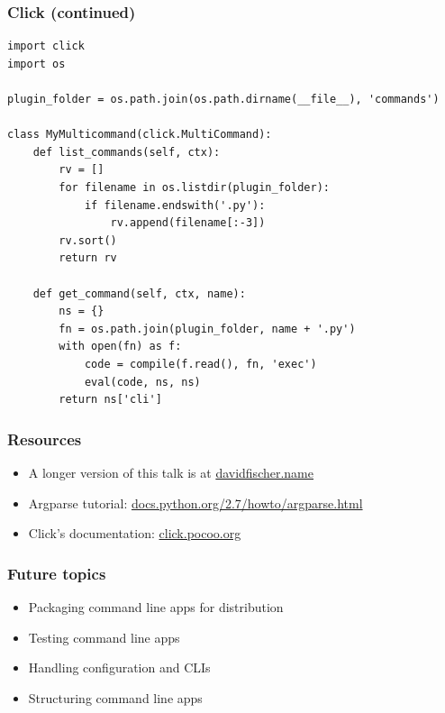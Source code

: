 \documentclass[handout]{beamer}
\begin{document}
\begin{frame}[fragile]
\frametitle{Click (continued)}

{\scriptsize
\begin{verbatim}
import click
import os

plugin_folder = os.path.join(os.path.dirname(__file__), 'commands')

class MyMulticommand(click.MultiCommand):
    def list_commands(self, ctx):
        rv = []
        for filename in os.listdir(plugin_folder):
            if filename.endswith('.py'):
                rv.append(filename[:-3])
        rv.sort()
        return rv

    def get_command(self, ctx, name):
        ns = {}
        fn = os.path.join(plugin_folder, name + '.py')
        with open(fn) as f:
            code = compile(f.read(), fn, 'exec')
            eval(code, ns, ns)
        return ns['cli']
\end{verbatim}
}

\end{frame}



\begin{frame}
\frametitle{Resources}
  \begin{itemize}
    \item {\small A longer version of this talk is at \href{https://www.davidfischer.name}{davidfischer.name}}
    \item {\small Argparse tutorial: \href{https://docs.python.org/2.7/howto/argparse.html}{docs.python.org/2.7/howto/argparse.html}}
    \item {\small Click's documentation: \href{http://click.pocoo.org/}{click.pocoo.org}}
  \end{itemize}
\end{frame}


\begin{frame}
\frametitle{Future topics}
  \begin{itemize}
    \item {\small Packaging command line apps for distribution}
    \item {\small Testing command line apps}
    \item {\small Handling configuration and CLIs}
    \item {\small Structuring command line apps}
  \end{itemize}
\end{frame}
\end{document}
